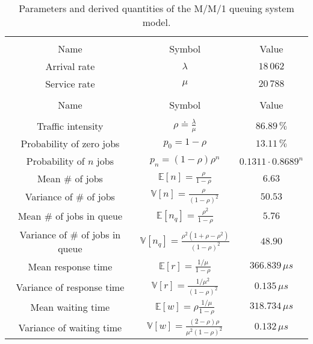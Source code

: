 \documentclass[11pt]{article}
\theoremstyle{definition}
\newcommand\df\doteq
\newcommand\E[1]{\mathbb E[#1]}
\newcommand\V[1]{\mathbb V[#1]}
\begin{document}
\begin{table}[h!]
    \newcommand\s2
    \centering
    \small
    {
        \begin{tabular}{|c|c||c|}
            \hline
            \rowcolor{Gray}
            \multicolumn{2}{|c||}{Parameters} & \\
            \hhline{|-|-||~|}
            \rowcolor{Gray} Name & Symbol & \multirow{-2}{*}{Value} \\
            \hline
            Arrival rate & $\lambda$ & $18\,062$ \\
            Service rate & $\mu$ & $20\,788$ \\
            \rowcolor{Gray}
            \hline
            \multicolumn{2}{|c||}{Derived quantities} & \\
            \hhline{|-|-||~|}
            \rowcolor{Gray} Name & Symbol & \multirow{-2}{*}{Value} \\
            \hline & & \\[-2 mm]
            Traffic intensity & $\rho\df\frac\lambda\mu$ & $86.89\,\%$ \\[\s mm]
            Probability of zero jobs & $p_0=1-\rho$ & $13.11\,\%$ \\[\s mm]
            Probability of $n$ jobs & $p_n=(1-\rho)\rho^n$ & $0.1311\cdot0.8689^n$ \\[\s mm]
            Mean \# of jobs & $\E n=\frac\rho{1-\rho}$ & $6.63$ \\[\s mm]
            Variance of \# of jobs & $\V n=\frac\rho{(1-\rho)^2}$ & $50.53$ \\[\s mm]
            Mean \# of jobs in queue & $\E{n_q}=\frac{\rho^2}{1-\rho}$ & $5.76$ \\[\s mm]
            Variance of \# of jobs in queue & $\V{n_q}=\frac{\rho^2(1+\rho-\rho^2)}{(1-\rho)^2}$ & $48.90$ \\[\s mm]
            Mean response time & $\E r=\frac{1/\mu}{1-\rho}$ & $366.839\,\mu s$ \\[\s mm]
            Variance of response time & $\V r=\frac{1/\mu^2}{(1-\rho)^2}$ & $0.135\,\mu s$ \\[\s mm]
            Mean waiting time & $\E w=\rho\frac{1/\mu}{1-\rho}$ & $318.734\,\mu s$ \\[\s mm]
            Variance of waiting time & $\V w=\frac{(2-\rho)\rho}{\mu^2(1-\rho)^2}$ & $0.132\,\mu s$ \\[\s mm]
            \hline
        \end{tabular}
    }
    \caption{Parameters and derived quantities of the M/M/1 queuing system model.}
    \label{tab:1_MM1}
\end{table}
\end{document}
